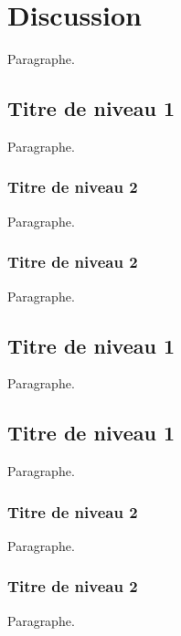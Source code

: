 \chapter{Discussion}\label{chap:discussion}

Paragraphe.
\lipsum[1] %

\section{Titre de niveau 1}\label{sec:discussion-1}
Paragraphe.
\lipsum[1] %

\subsection{Titre de niveau 2}\label{subsec:discussion-1-1}
Paragraphe.
\lipsum[1] %

\subsection{Titre de niveau 2}\label{subsec:discussion-1-2}
Paragraphe.
\lipsum[1] %

\section{Titre de niveau 1}\label{sec:discussion-2}
Paragraphe.
\lipsum[1] %

\section{Titre de niveau 1}\label{sec:discussion-3}
Paragraphe.
\lipsum[1] %

\subsection{Titre de niveau 2}\label{subsec:discussion-3-1}
Paragraphe.
\lipsum[1] %

\subsection{Titre de niveau 2}\label{subsec:discussion-3-2}
Paragraphe.

\lipsum[1] %